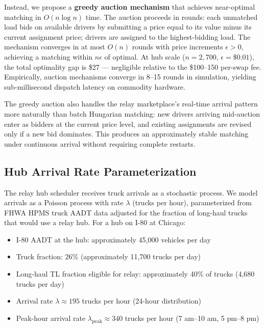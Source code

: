 Instead, we propose a \textbf{greedy auction mechanism} \citep{Bertsekas1988auction} that achieves near-optimal matching in $O(n \log n)$ time. The auction proceeds in rounds: each unmatched load bids on available drivers by submitting a price equal to its value minus its current assignment price; drivers are assigned to the highest-bidding load. The mechanism converges in at most $O(n)$ rounds with price increments $\epsilon > 0$, achieving a matching within $n \epsilon$ of optimal. At hub scale ($n = 2{,}700$, $\epsilon = \$0.01$), the total optimality gap is \$27 --- negligible relative to the \$100--150 per-swap fee. Empirically, auction mechanisms converge in 8--15 rounds in simulation, yielding sub-millisecond dispatch latency on commodity hardware.

The greedy auction also handles the relay marketplace's real-time arrival pattern more naturally than batch Hungarian matching: new drivers arriving mid-auction enter as bidders at the current price level, and existing assignments are revised only if a new bid dominates. This produces an approximately stable matching under continuous arrival \citep{Roth2002} without requiring complete restarts.

\subsection{Hub Arrival Rate Parameterization}

The relay hub scheduler receives truck arrivals as a stochastic process. We model arrivals as a Poisson process with rate $\lambda$ (trucks per hour), parameterized from FHWA HPMS truck AADT data \citep{HPMS2018} adjusted for the fraction of long-haul trucks that would use a relay hub. For a hub on I-80 at Chicago:

\begin{itemize}
  \item I-80 AADT at the hub: approximately 45,000 vehicles per day \citep{HPMS2018}
  \item Truck fraction: 26\% (approximately 11,700 trucks per day)
  \item Long-haul TL fraction eligible for relay: approximately 40\% of trucks (4,680 trucks per day)
  \item Arrival rate $\lambda \approx 195$ trucks per hour (24-hour distribution)
  \item Peak-hour arrival rate $\lambda_{\text{peak}} \approx 340$ trucks per hour (7 am--10 am, 5 pm--8 pm)
\end{itemize}

